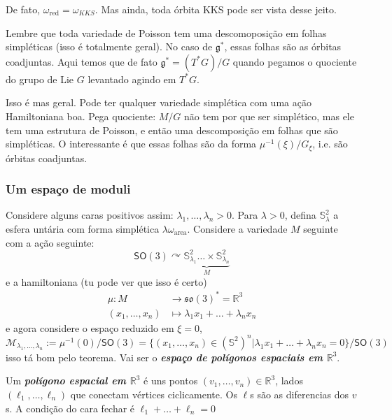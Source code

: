 \begin{exercise}\leavevmode
	De fato, $\omega_{\operatorname{red}}=\omega_{K K S}$. Mas ainda, toda órbita KKS pode ser vista desse jeito.
\end{exercise}

\begin{remark}\leavevmode
	Lembre que toda variedade de Poisson tem uma descomoposição em folhas simpléticas (isso é totalmente geral). No caso de $\mathfrak{g}^*$, essas folhas são as órbitas coadjuntas. Aqui temos que de fato  $\mathfrak{g}^*=(T^*G)/G$ quando pegamos o quociente do grupo de Lie $G$ levantado agindo em $T^*G$.

	Isso é mas geral. Pode ter qualquer variedade simplética com uma ação Hamiltoniana boa. Pega quociente: $M/G$  não tem por que ser simplético, mas ele tem uma estrutura de Poisson, e então uma descomposição em folhas que são simpléticas. O interessante é que essas folhas são da forma $\mu^{-1}(\xi)/G_\xi$, i.e. são órbitas coadjuntas.
\end{remark}

\subsubsection{Um espaço de moduli}

Considere alguns caras positivos assim: $\lambda_1,\ldots,\lambda_n>0$. Para $\lambda>0$, defina $\mathbb{S}^2_\lambda$ a esfera untária com forma simplética $\lambda\omega_{\operatorname{area}}$. Considere a variedade $M$ seguinte com a ação seguinte:
\[\mathsf{SO}(3) \curvearrowright \underbrace{\mathbb{S}^2_{\lambda_1}\ldots \times \mathbb{S}^2_{\lambda_n}}_{M}\]
e a hamiltoniana (tu pode ver que isso é certo)
\begin{align*}
	\mu: M &\longrightarrow \mathfrak{so}(3)^*=\mathbb{R}^3 \\
	(x_1,\ldots,x_n) &\longmapsto \lambda_1x_1+\ldots +\lambda_nx_n
\end{align*}
e agora considere o espaço reduzido em $\xi=0$,
\[\mathcal{M}_{\lambda_1,\ldots,\lambda_n}:=\mu^{-1}(0)/\mathsf{SO}(3) =\{(x_1,\ldots,x_n)\in(\mathbb{S}^2)^n|\lambda_1x_1+\ldots +\lambda_nx_n=0\} \Big/\mathsf{SO}(3)\]
isso tá bom pelo teorema. Vai ser o \textit{\textbf{espaço de polígonos espaciais em $\mathbb{R}^{3}$}}.

\begin{defn}\leavevmode
	Um \textit{\textbf{polígono espacial em $\mathbb{R}^{3}$}} é uns pontos $(v_1,\ldots,v_n)\in\mathbb{R}^{3}$, lados $(\ell_1,\ldots,\ell_n)$ que conectam vértices ciclicamente. Os $\ell$s são as diferencias dos $v$s. A condição do cara fechar é $\ell_1+\ldots +\ell_n=0$
\end{defn}


